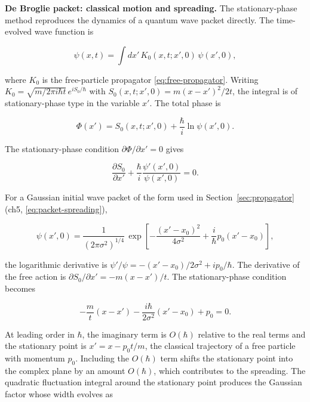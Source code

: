 \medskip\noindent\textbf{De Broglie packet: classical motion and spreading.}
The stationary-phase method reproduces the dynamics of a quantum wave packet directly. The time-evolved wave function is
\begin{linenomath}
\begin{equation}
\psi(x,t) = \int dx'\, K_0(x,t;x',0)\,\psi(x',0),
\end{equation}
\end{linenomath}
where $K_0$ is the free-particle propagator \eqref{eq:free-propagator}. Writing $K_0 = \sqrt{m/2\pi i\hbar t}\, e^{i S_0/\hbar}$ with $S_0(x,t;x',0) = m(x-x')^2/2t$, the integral is of stationary-phase type in the variable $x'$. The total phase is
\begin{linenomath}
\begin{equation}
\Phi(x') = S_0(x,t;x',0) + \frac{\hbar}{i}\ln\psi(x',0).
\end{equation}
\end{linenomath}
The stationary-phase condition $\partial\Phi/\partial x' = 0$ gives
\begin{linenomath}
\begin{equation}
\frac{\partial S_0}{\partial x'} + \frac{\hbar}{i}\frac{\psi'(x',0)}{\psi(x',0)} = 0.
\label{eq:stationary-phase-packet}
\end{equation}
\end{linenomath}
For a Gaussian initial wave packet of the form used in Section~\ref{sec:propagator} (ch5, \eqref{eq:packet-spreading}),
\begin{linenomath}
\begin{equation}
\psi(x',0) = \frac{1}{(2\pi\sigma^2)^{1/4}}\,
\exp\!\left[-\frac{(x'-x_0)^2}{4\sigma^2} + \frac{i}{\hbar}p_0(x'-x_0)\right],
\end{equation}
\end{linenomath}
the logarithmic derivative is $\psi'/\psi = -(x'-x_0)/2\sigma^2 + ip_0/\hbar$. The derivative of the free action is $\partial S_0/\partial x' = -m(x-x')/t$. The stationary-phase condition becomes
\begin{linenomath}
\begin{equation}
-\frac{m}{t}(x - x') - \frac{i\hbar}{2\sigma^2}(x'-x_0) + p_0 = 0.
\end{equation}
\end{linenomath}
At leading order in $\hbar$, the imaginary term is $O(\hbar)$ relative to the real terms and the stationary point is $x' = x - p_0 t/m$, the classical trajectory of a free particle with momentum $p_0$. Including the $O(\hbar)$ term shifts the stationary point into the complex plane by an amount $O(\hbar)$, which contributes to the spreading. The quadratic fluctuation integral around the stationary point produces the Gaussian factor whose width evolves as
